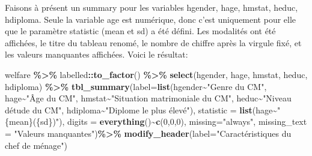 \documentclass[
]{article}
\newenvironment{Shaded}{\begin{snugshade}}{\end{snugshade}}
\newcommand{\AttributeTok}[1]{\textcolor[rgb]{0.13,0.29,0.53}{#1}}
\newcommand{\DecValTok}[1]{\textcolor[rgb]{0.00,0.00,0.81}{#1}}
\newcommand{\FunctionTok}[1]{\textcolor[rgb]{0.13,0.29,0.53}{\textbf{#1}}}
\newcommand{\NormalTok}[1]{#1}
\newcommand{\SpecialCharTok}[1]{\textcolor[rgb]{0.81,0.36,0.00}{\textbf{#1}}}
\newcommand{\StringTok}[1]{\textcolor[rgb]{0.31,0.60,0.02}{#1}}
\begin{document}
Faisons à présent un summary pour les variables hgender, hage, hmstat,
heduc, hdiploma. Seule la variable age est numérique, donc c'est
uniquement pour elle que le paramètre statistic (mean et sd) a été
défini. Les modalités ont été affichées, le titre du tableau renomé, le
nombre de chiffre après la virgule fixé, et les valeurs manquantes
affichées. Voici le résultat:

\begin{Shaded}
\begin{Highlighting}[]
\NormalTok{welfare }\SpecialCharTok{\%\textgreater{}\%}
\NormalTok{  labelled}\SpecialCharTok{::}\FunctionTok{to\_factor}\NormalTok{() }\SpecialCharTok{\%\textgreater{}\%}
  \FunctionTok{select}\NormalTok{(hgender, hage, hmstat, heduc, hdiploma) }\SpecialCharTok{\%\textgreater{}\%}
  \FunctionTok{tbl\_summary}\NormalTok{(}\AttributeTok{label=}\FunctionTok{list}\NormalTok{(hgender}\SpecialCharTok{\textasciitilde{}}\StringTok{"Genre du CM"}\NormalTok{,}
\NormalTok{                         hage}\SpecialCharTok{\textasciitilde{}}\StringTok{"Âge du CM"}\NormalTok{,}
\NormalTok{                         hmstat}\SpecialCharTok{\textasciitilde{}}\StringTok{"Situation matrimoniale du CM"}\NormalTok{,}
\NormalTok{                         heduc}\SpecialCharTok{\textasciitilde{}}\StringTok{"Niveau d\textquotesingle{}étude du CM"}\NormalTok{,}
\NormalTok{                         hdiploma}\SpecialCharTok{\textasciitilde{}}\StringTok{"Diplome le plus élevé"}\NormalTok{),}
              \AttributeTok{statistic =} \FunctionTok{list}\NormalTok{(hage}\SpecialCharTok{\textasciitilde{}}\StringTok{"\{mean\}(\{sd\})"}\NormalTok{),}
              \AttributeTok{digits =} \FunctionTok{everything}\NormalTok{()}\SpecialCharTok{\textasciitilde{}}\FunctionTok{c}\NormalTok{(}\DecValTok{0}\NormalTok{,}\DecValTok{0}\NormalTok{,}\DecValTok{0}\NormalTok{),}
              \AttributeTok{missing=}\StringTok{"always"}\NormalTok{,}
              \AttributeTok{missing\_text =} \StringTok{"Valeurs manquantes"}\NormalTok{)}\SpecialCharTok{\%\textgreater{}\%}
  \FunctionTok{modify\_header}\NormalTok{(}\AttributeTok{label=}\StringTok{"Caractéristiques du chef de ménage"}\NormalTok{)}
\end{Highlighting}
\end{Shaded}
\end{document}
